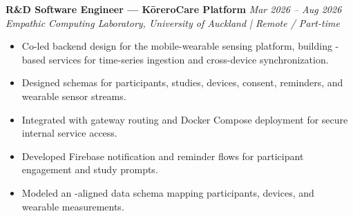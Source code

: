 \noindent
\textbf{R\&D Software Engineer — KōreroCare Platform} \hfill \textit{Mar 2026 -- Aug 2026}\\
\noindent
\textit{Empathic Computing Laboratory, University of Auckland | Remote / Part-time}\\[0.05em]

\begin{itemize}[leftmargin=*, itemsep=0.3em, topsep=0.01em]
  \item Co-led backend design for the  mobile-wearable sensing platform, building -based services for time-series ingestion and cross-device synchronization.
  \item Designed  schemas for participants, studies, devices, consent, reminders, and wearable sensor streams.
  \item Integrated  with  gateway routing and Docker Compose deployment for secure internal service access.
  \item Developed Firebase notification and reminder flows for participant engagement and study prompts.
  \item Modeled an -aligned data schema mapping participants, devices, and wearable measurements.
\end{itemize}
